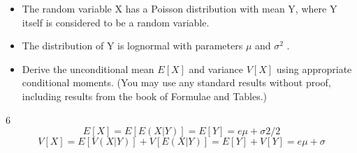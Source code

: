 \documentclass[a4paper,12pt]{article}
\begin{document}
\begin{itemize}
    \item The random variable X has a Poisson distribution with mean Y, where Y itself is
considered to be a random variable. 
\item The distribution of Y is lognormal with
parameters $\mu$ and $\sigma^2$ .
\item Derive the unconditional mean $E[X]$ and variance $V[X]$ using appropriate conditional
moments. (You may use any standard results without proof, including results from
the book of Formulae and Tables.)
\end{itemize}


6
\[E [ X ] = E [ E ( X | Y )] = E [ Y ] = e \mu+\sigma
2
/2\]
\[V [ X ] = E [ V ( X | Y )] + V [ E ( X | Y )] = E [ Y ] + V [ Y ] = e \mu+\sigma\]
\end{document}
